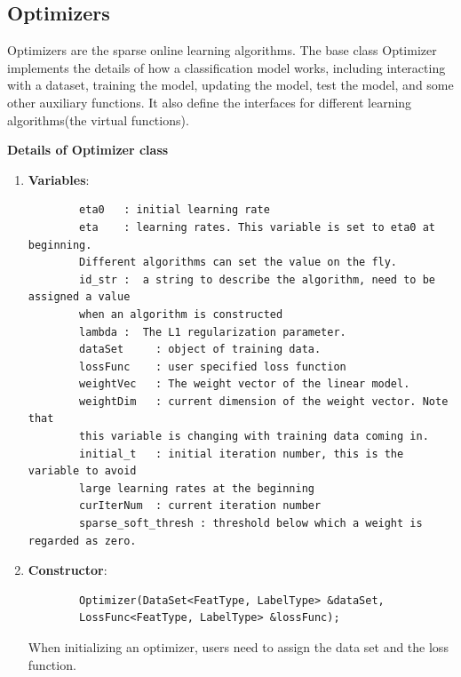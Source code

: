 \documentclass[11pt,a4paper]{article}
\newlength{\wideitemsep}
\let\olditem\item
\renewcommand{\item}{\setlength{\itemsep}{\wideitemsep}\olditem}
\begin{document}
\subsection{Optimizers}
Optimizers are the sparse online learning algorithms. The base class Optimizer
implements the details of how a classification model works, including
interacting with a dataset, training the model, updating the model, test the
model, and some other auxiliary functions. It also define the interfaces for
different learning algorithms(the virtual functions).

\vspace{4mm}\hspace{-5mm}\textbf{Details of Optimizer class}
\vspace{2mm}

\begin{enumerate}
    \item \textbf{Variables}:

        \lstset{language=bash,
            framexleftmargin=-1.5cm,
            xleftmargin=-2cm,
        }
        \begin{lstlisting}
        eta0   : initial learning rate
        eta    : learning rates. This variable is set to eta0 at beginning.
        Different algorithms can set the value on the fly.
        id_str :  a string to describe the algorithm, need to be assigned a value 
        when an algorithm is constructed
        lambda :  The L1 regularization parameter.
        dataSet     : object of training data.
        lossFunc    : user specified loss function
        weightVec   : The weight vector of the linear model.
        weightDim   : current dimension of the weight vector. Note that 
        this variable is changing with training data coming in.
        initial_t   : initial iteration number, this is the variable to avoid 
        large learning rates at the beginning
        curIterNum  : current iteration number
        sparse_soft_thresh : threshold below which a weight is regarded as zero.
        \end{lstlisting}

    \item \textbf{Constructor}:

        \lstset{language=C++}
        \begin{lstlisting}
        Optimizer(DataSet<FeatType, LabelType> &dataSet, 
        LossFunc<FeatType, LabelType> &lossFunc); 
        \end{lstlisting}
        When initializing an optimizer, users need to assign the data set and
        the loss function. 


\end{enumerate}
\end{document}
